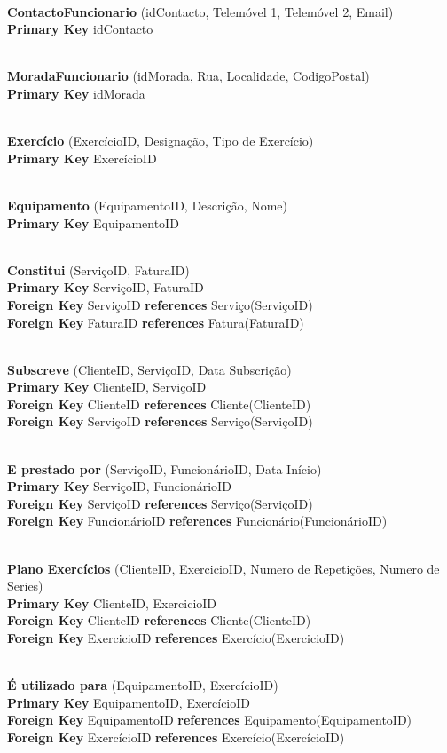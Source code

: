 \noindent
\\\textbf{ContactoFuncionario} (idContacto, Telemóvel 1, Telemóvel 2, Email)
\\\textbf{Primary Key} idContacto

\noindent
\\\textbf{MoradaFuncionario} (idMorada, Rua, Localidade, CodigoPostal)
\\\textbf{Primary Key} idMorada

\noindent
\\\textbf{Exercício} (ExercícioID, Designação, Tipo de Exercício)
\\\textbf{Primary Key} ExercícioID

\noindent
\\\textbf{Equipamento} (EquipamentoID, Descrição, Nome)
\\\textbf{Primary Key} EquipamentoID

\noindent
\\\textbf{Constitui} (ServiçoID, FaturaID)
\\\textbf{Primary Key} ServiçoID, FaturaID
\\\textbf{Foreign Key} ServiçoID \textbf{references} Serviço(ServiçoID)
\\\textbf{Foreign Key} FaturaID \textbf{references} Fatura(FaturaID)

\noindent
\\\textbf{Subscreve} (ClienteID, ServiçoID, Data Subscrição)
\\\textbf{Primary Key} ClienteID, ServiçoID
\\\textbf{Foreign Key} ClienteID \textbf{references} Cliente(ClienteID)
\\\textbf{Foreign Key} ServiçoID \textbf{references} Serviço(ServiçoID) 

\noindent
\\\textbf{E prestado por} (ServiçoID, FuncionárioID, Data Início)
\\\textbf{Primary Key} ServiçoID, FuncionárioID
\\\textbf{Foreign Key} ServiçoID \textbf{references} Serviço(ServiçoID)
\\\textbf{Foreign Key} FuncionárioID \textbf{references} Funcionário(FuncionárioID)

\noindent
\\\textbf{Plano Exercícios} (ClienteID, ExercicioID, Numero de Repetições, Numero de Series)
\\\textbf{Primary Key} ClienteID, ExercicioID
\\\textbf{Foreign Key} ClienteID \textbf{references} Cliente(ClienteID)
\\\textbf{Foreign Key} ExercicioID \textbf{references} Exercício(ExercicioID)

\noindent
\\\textbf{É utilizado para} (EquipamentoID, ExercícioID)
\\\textbf{Primary Key} EquipamentoID, ExercícioID
\\\textbf{Foreign Key} EquipamentoID \textbf{references} Equipamento(EquipamentoID)
\\\textbf{Foreign Key} ExercícioID \textbf{references} Exercício(ExercícioID)


